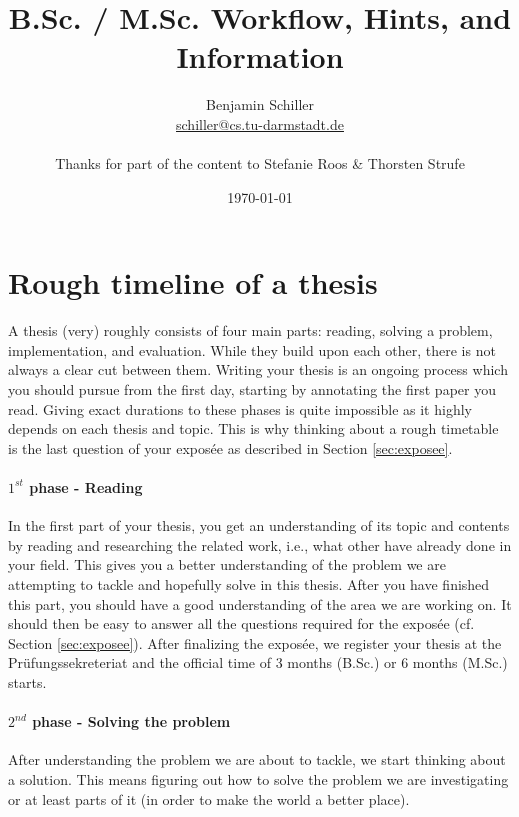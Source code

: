 \documentclass{article}
\title{B.Sc. / M.Sc. Workflow, Hints, and Information}
\author{Benjamin Schiller\\\url{schiller@cs.tu-darmstadt.de}\\\\\small{Thanks for part of the content to Stefanie Roos \& Thorsten Strufe}}
\date{\today}
\begin{document}
\maketitle




\section{Rough timeline of a thesis}
A thesis (very) roughly consists of four main parts: reading, solving a problem, implementation, and evaluation.
While they build upon each other, there is not always a clear cut between them.
Writing your thesis is an ongoing process which you should pursue from the first day, starting by annotating the first paper you read.
Giving exact durations to these phases is quite impossible as it highly depends on each thesis and topic.
This is why thinking about a rough timetable is the last question of your expos\'{e}e as described in Section \ref{sec:exposee}.

\paragraph{$1^{st}$ phase - Reading}
In the first part of your thesis, you get an understanding of its topic and contents by reading and researching the related work, i.e., what other have already done in your field.
This gives you a better understanding of the problem we are attempting to tackle and hopefully solve in this thesis.
After you have finished this part, you should have a good understanding of the area we are working on.
It should then be easy to answer all the questions required for the expos\'{e}e (cf. Section \ref{sec:exposee}).
After finalizing the expos\'{e}e, we register your thesis at the Pr\"{u}fungssekreteriat and the official time of 3 months (B.Sc.) or 6 months (M.Sc.) starts.

\paragraph{$2^{nd}$ phase - Solving the problem}
After understanding the problem we are about to tackle, we start thinking about a solution.
This means figuring out how to solve the problem we are investigating or at least parts of it (in order to make the world a better place).
\end{document}
